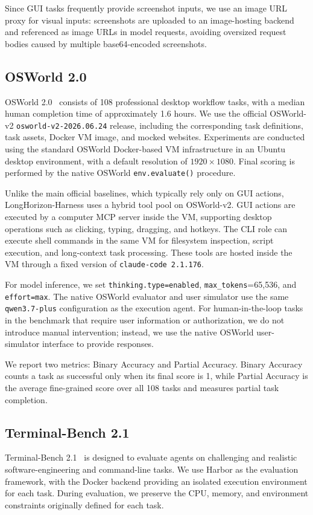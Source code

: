 Since GUI tasks frequently provide screenshot inputs, we use an image URL proxy for visual inputs: screenshots are uploaded to an image-hosting backend and referenced as image URLs in model requests, avoiding oversized request bodies caused by multiple base64-encoded screenshots.

\subsection{OSWorld 2.0}
OSWorld 2.0~\cite{osworld2} consists of 108 professional desktop workflow tasks, with a median human completion time of approximately 1.6 hours. We use the official OSWorld-v2 \texttt{osworld-v2-2026.06.24} release, including the corresponding task definitions, task assets, Docker VM image, and mocked websites. Experiments are conducted using the standard OSWorld Docker-based VM infrastructure in an Ubuntu desktop environment, with a default resolution of $1920\times1080$. Final scoring is performed by the native OSWorld \texttt{env.evaluate()} procedure.

Unlike the main official baselines, which typically rely only on GUI actions, LongHorizon-Harness uses a hybrid tool pool on OSWorld-v2. GUI actions are executed by a computer MCP server inside the VM, supporting desktop operations such as clicking, typing, dragging, and hotkeys. The CLI role can execute shell commands in the same VM for filesystem inspection, script execution, and long-context task processing. These tools are hosted inside the VM through a fixed version of \texttt{claude-code 2.1.176}.

For model inference, we set \texttt{thinking.type=enabled}, \texttt{max\_tokens}=65{,}536, and \texttt{effort=max}. The native OSWorld evaluator and user simulator use the same \texttt{qwen3.7-plus} configuration as the execution agent. For human-in-the-loop tasks in the benchmark that require user information or authorization, we do not introduce manual intervention; instead, we use the native OSWorld user-simulator interface to provide responses.

We report two metrics: Binary Accuracy and Partial Accuracy. Binary Accuracy counts a task as successful only when its final score is 1, while Partial Accuracy is the average fine-grained score over all 108 tasks and measures partial task completion.

\subsection{Terminal-Bench 2.1}
Terminal-Bench 2.1~\cite{terminalbench} is designed to evaluate agents on challenging and realistic software-engineering and command-line tasks. We use Harbor as the evaluation framework, with the Docker backend providing an isolated execution environment for each task. During evaluation, we preserve the CPU, memory, and environment constraints originally defined for each task.

